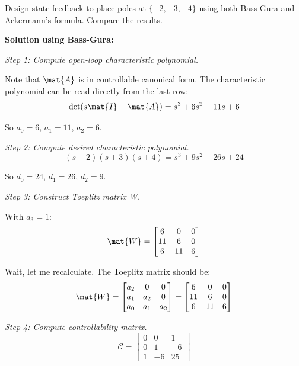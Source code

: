 Design state feedback to place poles at $\{-2, -3, -4\}$ using both Bass-Gura and Ackermann's formula. Compare the results.

\textbf{Solution using Bass-Gura:}

\textit{Step 1: Compute open-loop characteristic polynomial.}

Note that $\mat{A}$ is in controllable canonical form. The characteristic polynomial can be read directly from the last row:
\begin{equation}
\det(s\mat{I} - \mat{A}) = s^3 + 6s^2 + 11s + 6
\end{equation}

So $a_0 = 6$, $a_1 = 11$, $a_2 = 6$.

\textit{Step 2: Compute desired characteristic polynomial.}
\begin{equation}
(s+2)(s+3)(s+4) = s^3 + 9s^2 + 26s + 24
\end{equation}

So $d_0 = 24$, $d_1 = 26$, $d_2 = 9$.

\textit{Step 3: Construct Toeplitz matrix W.}

With $a_3 = 1$:
\begin{equation}
\mat{W} = \begin{bmatrix} 6 & 0 & 0 \\ 11 & 6 & 0 \\ 6 & 11 & 6 \end{bmatrix}
\end{equation}

Wait, let me recalculate. The Toeplitz matrix should be:
\begin{equation}
\mat{W} = \begin{bmatrix} a_2 & 0 & 0 \\ a_1 & a_2 & 0 \\ a_0 & a_1 & a_2 \end{bmatrix}
= \begin{bmatrix} 6 & 0 & 0 \\ 11 & 6 & 0 \\ 6 & 11 & 6 \end{bmatrix}
\end{equation}

\textit{Step 4: Compute controllability matrix.}
\begin{equation}
\mathcal{C} = \begin{bmatrix} 0 & 0 & 1 \\ 0 & 1 & -6 \\ 1 & -6 & 25 \end{bmatrix}
\end{equation}

